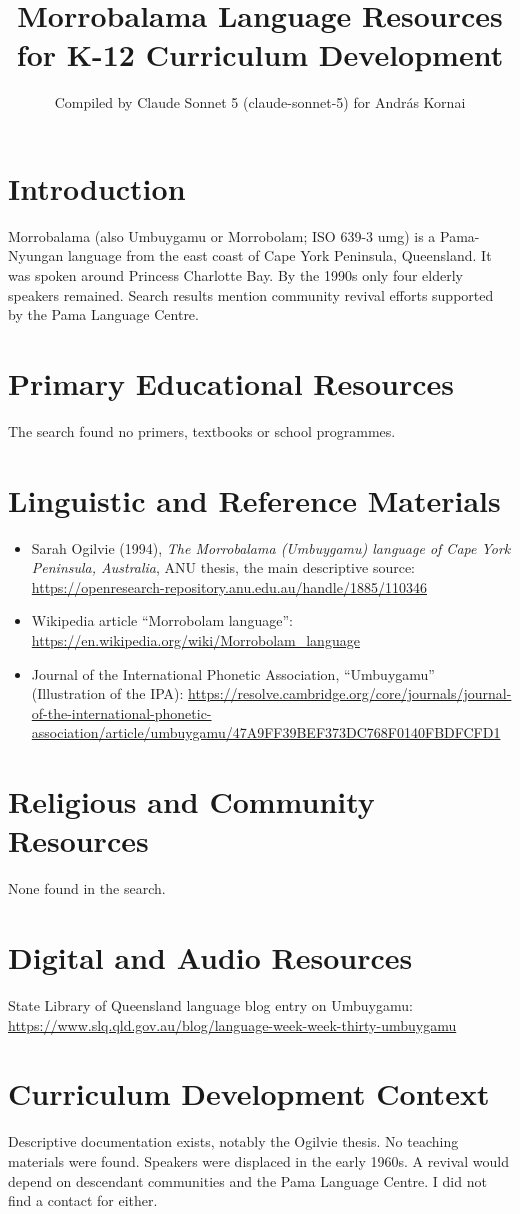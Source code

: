 \documentclass[12pt]{article}
\title{Morrobalama Language Resources for K-12 Curriculum Development}
\author{Compiled by Claude Sonnet 5 (claude-sonnet-5) for Andr\'as Kornai}
\date{}
\begin{document}
\maketitle

\section{Introduction}
Morrobalama (also Umbuygamu or Morrobolam; ISO 639-3 umg) is a Pama-Nyungan language from the east coast of Cape York Peninsula, Queensland. It was spoken around Princess Charlotte Bay. By the 1990s only four elderly speakers remained. Search results mention community revival efforts supported by the Pama Language Centre.

\section{Primary Educational Resources}
The search found no primers, textbooks or school programmes.

\section{Linguistic and Reference Materials}
\begin{itemize}
\item Sarah Ogilvie (1994), \emph{The Morrobalama (Umbuygamu) language of Cape York Peninsula, Australia}, ANU thesis, the main descriptive source: \url{https://openresearch-repository.anu.edu.au/handle/1885/110346}
\item Wikipedia article ``Morrobolam language'': \url{https://en.wikipedia.org/wiki/Morrobolam_language}
\item Journal of the International Phonetic Association, ``Umbuygamu'' (Illustration of the IPA): \url{https://resolve.cambridge.org/core/journals/journal-of-the-international-phonetic-association/article/umbuygamu/47A9FF39BEF373DC768F0140FBDFCFD1}
\end{itemize}

\section{Religious and Community Resources}
None found in the search.

\section{Digital and Audio Resources}
State Library of Queensland language blog entry on Umbuygamu: \url{https://www.slq.qld.gov.au/blog/language-week-week-thirty-umbuygamu}

\section{Curriculum Development Context}
Descriptive documentation exists, notably the Ogilvie thesis. No teaching materials were found. Speakers were displaced in the early 1960s. A revival would depend on descendant communities and the Pama Language Centre. I did not find a contact for either.
\end{document}
